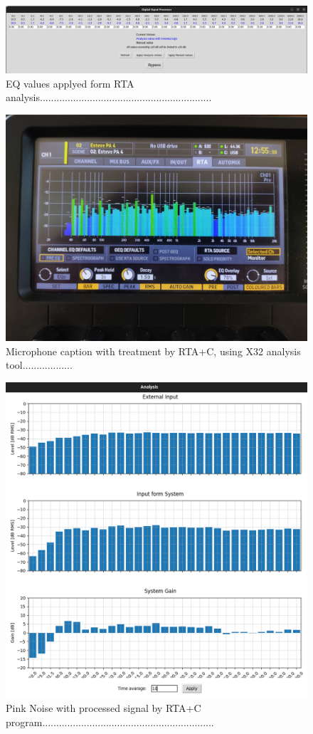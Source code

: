 \begin{figure}[H]
	\centering
	\includegraphics[width=1
	\linewidth]{Figures/Coro_EQ_from_RTA.png}
	\caption{EQ values applyed form RTA analysis..............................................................}
	\label{fig:Coro_EQ_RTA+C}
\end{figure}

\begin{figure}[H]
	\centering
	\includegraphics[width=0.6
	\linewidth]{Figures/Coro_X32_treatedRTAc.jpeg}
	\caption{Microphone caption with treatment by RTA+C, using X32 analysis tool..................}
	\label{fig:Coro_X32_RTA+C}
\end{figure}

\begin{figure}[H]
	\centering
	\includegraphics[width=0.6
	\linewidth]{Figures/Coro_RTA+EQ_ON.png}
	\caption{Pink Noise with processed signal by RTA+C program..............................................................}
	\label{fig:Coro_RTA_RTA+C}
\end{figure}

